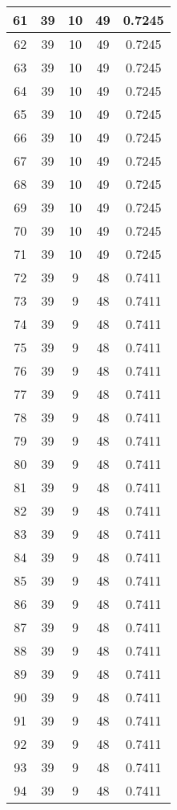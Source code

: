 \documentclass[letterpaper, 12pt]{article}
\begin{document}
\begin{longtable}{|c|c|c|c|c|}
\hline
61 & 39 & 10 & 49 & 0.7245 \\
\hline
62 & 39 & 10 & 49 & 0.7245 \\
\hline
63 & 39 & 10 & 49 & 0.7245 \\
\hline
64 & 39 & 10 & 49 & 0.7245 \\
\hline
65 & 39 & 10 & 49 & 0.7245 \\
\hline
66 & 39 & 10 & 49 & 0.7245 \\
\hline
67 & 39 & 10 & 49 & 0.7245 \\
\hline
68 & 39 & 10 & 49 & 0.7245 \\
\hline
69 & 39 & 10 & 49 & 0.7245 \\
\hline
70 & 39 & 10 & 49 & 0.7245 \\
\hline
71 & 39 & 10 & 49 & 0.7245 \\
\hline
72 & 39 & 9 & 48 & 0.7411 \\
\hline
73 & 39 & 9 & 48 & 0.7411 \\
\hline
74 & 39 & 9 & 48 & 0.7411 \\
\hline
75 & 39 & 9 & 48 & 0.7411 \\
\hline
76 & 39 & 9 & 48 & 0.7411 \\
\hline
77 & 39 & 9 & 48 & 0.7411 \\
\hline
78 & 39 & 9 & 48 & 0.7411 \\
\hline
79 & 39 & 9 & 48 & 0.7411 \\
\hline
80 & 39 & 9 & 48 & 0.7411 \\
\hline
81 & 39 & 9 & 48 & 0.7411 \\
\hline
82 & 39 & 9 & 48 & 0.7411 \\
\hline
83 & 39 & 9 & 48 & 0.7411 \\
\hline
84 & 39 & 9 & 48 & 0.7411 \\
\hline
85 & 39 & 9 & 48 & 0.7411 \\
\hline
86 & 39 & 9 & 48 & 0.7411 \\
\hline
87 & 39 & 9 & 48 & 0.7411 \\
\hline
88 & 39 & 9 & 48 & 0.7411 \\
\hline
89 & 39 & 9 & 48 & 0.7411 \\
\hline
90 & 39 & 9 & 48 & 0.7411 \\
\hline
91 & 39 & 9 & 48 & 0.7411 \\
\hline
92 & 39 & 9 & 48 & 0.7411 \\
\hline
93 & 39 & 9 & 48 & 0.7411 \\
\hline
94 & 39 & 9 & 48 & 0.7411 \\
\hline

\end{longtable}
\end{document}
